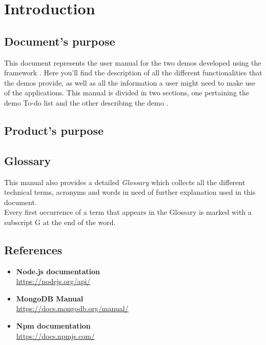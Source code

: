 \section{Introduction}

\subsection{Document's purpose}
This document represents the user manual for the two demos developed using the framework \ProjectName{}. Here you'll find the description of all the different functionalities that the demos provide, as well as all the information a user might need to make use of the applications. This manual is divided in two sections, one pertaining the demo To-do list and the other describing the demo \DemoName{}.  

\subsection{Product's purpose}
\ScopoDelProdottoEng{}

\subsection{Glossary}
This manual also provides a detailed \textit{Glossary} which collects all the different technical terms, acronyms and words in need of further explanation used in this document.\\
Every first occurrence of a term that appears in the Glossary is marked with a subscript G at the end of the word.

\subsection{References}
\begin{itemize}
	\item \textbf{Node.js documentation}
	\\ \url{https://nodejs.org/api/}
	\item \textbf{MongoDB Manual}
	\\ \url{https://docs.mongodb.org/manual/}
	\item \textbf{Npm documentation}
	\\ \url{https://docs.npmjs.com/}
\end{itemize}
